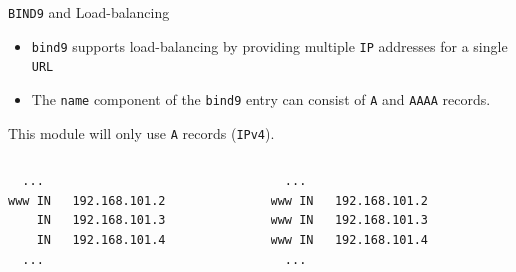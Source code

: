 \documentclass[xcolor=table]{beamer}
\begin{document}
\begin{frame}[fragile]{\texttt{BIND9} and Load-balancing}
  \begin{itemize}
    \item \texttt{bind9} supports load-balancing by providing multiple \texttt{IP} addresses for a single \texttt{URL}
    \item The \texttt{name} component of the \texttt{bind9} entry can consist of \texttt{A} and \texttt{AAAA} records.
  \end{itemize}
  \begin{tcolorbox}
    \begin{center}
      \scriptsize This module will only use \texttt{A} records (\texttt{IPv4}).
    \end{center}
  \end{tcolorbox}
  \begin{columns}
    \begin{column}{0.5\textwidth}
      \begin{tcolorbox}
        \lstset{
          basicstyle=\scriptsize\ttfamily,
        }
    \begin{lstlisting}
  ...
www IN   192.168.101.2
    IN	 192.168.101.3
    IN	 192.168.101.4
  ...
    \end{lstlisting}
      \end{tcolorbox}
    \end{column}
    \begin{column}{0.5\textwidth}
      \begin{tcolorbox}
        \lstset{
          basicstyle=\scriptsize\ttfamily,
        }
    \begin{lstlisting}
  ...
www IN   192.168.101.2
www IN   192.168.101.3
www IN   192.168.101.4
  ...
    \end{lstlisting}
      \end{tcolorbox}
    \end{column}
  \end{columns}
\end{frame}
\end{document}
